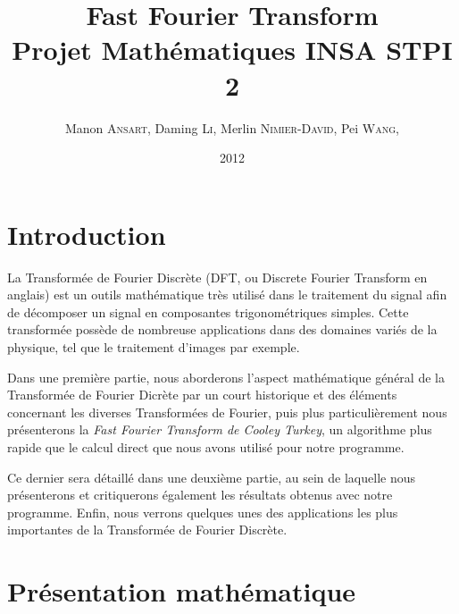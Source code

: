 \documentclass{report}
\title{
		Fast Fourier Transform\\
		Projet Mathématiques INSA STPI 2
}
\author{
	Manon \textsc{Ansart}, 
	Daming \textsc{Li},
	Merlin \textsc{Nimier-David}, 
	Pei \textsc{Wang}, 
}
\date{2012}
\begin{document}
	\maketitle

	\tableofcontents



	\chapter{Introduction}
	La Transformée de Fourier Discrète (DFT, ou Discrete Fourier Transform en anglais) est un outils mathématique très utilisé dans le traitement du signal afin de décomposer un signal en composantes trigonométriques simples. Cette transformée possède de nombreuse applications dans des domaines variés de la physique, tel que le traitement d'images par exemple.
	
	Dans une première partie, nous aborderons l'aspect mathématique général de la Transformée de Fourier Dicrète par un court historique et des éléments concernant les diverses Transformées de Fourier, puis plus particulièrement nous présenterons la \emph{Fast Fourier Transform de Cooley Turkey}, un algorithme plus rapide que le calcul direct que nous avons utilisé pour notre programme.

	Ce dernier sera détaillé dans une deuxième partie, au sein de laquelle nous présenterons et critiquerons également les résultats obtenus avec notre programme. Enfin, nous verrons quelques unes des applications les plus importantes de la Transformée de Fourier Discrète.



	\chapter{Présentation mathématique}

\end{document}
